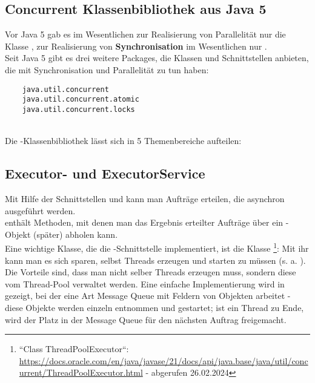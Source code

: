 \subsection{Concurrent Klassenbibliothek aus Java 5}

Vor Java 5 gab es im Wesentlichen zur Realisierung von Parallelität nur die Klasse , zur Realisierung von \textbf{Synchronisation} im Wesentlichen nur .\\

\noindent
Seit Java 5 gibt es drei weitere Packages, die Klassen und Schnittstellen anbieten, die mit Synchronisation und Parallelität zu tun haben:



\begin{verbatim}
    java.util.concurrent
    java.util.concurrent.atomic
    java.util.concurrent.locks
\end{verbatim}\\

\noindent
Die -Klassenbibliothek lässt sich in 5 Themenbereiche aufteilen:

\subsection*{Executor- und ExecutorService}
Mit Hilfe der Schnittstellen  und  kann man Aufträge erteilen, die asynchron ausgeführt werden.\\

\noindent
{} enthält Methoden, mit denen man das Ergebnis erteilter Aufträge über ein -Objekt (später) abholen kann.\\

\noindent
Eine wichtige Klasse, die die -Schnittstelle implementiert, ist die Klasse \footnote{
``Class ThreadPoolExecutor``: \url{https://docs.oracle.com/en/java/javase/21/docs/api/java.base/java/util/concurrent/ThreadPoolExecutor.html} - abgerufen 26.02.2024
}:
Mit ihr kann man es sich sparen, selbst Threads erzeugen und starten zu müssen (s. a. \cite[146]{Oec22}).
Die Vorteile sind, dass man nicht selber Threads erzeugen muss, sondern diese vom Thread-Pool verwaltet werden.
Eine einfache Implementierung wird in \cite[144]{Oec22} gezeigt, bei der eine Art Message Queue mit Feldern von 
Objekten arbeitet - diese Objekte werden einzeln entnommen und gestartet; ist ein Thread zu Ende, wird der Platz in der
Message Queue für den nächsten Auftrag freigemacht.
\\

